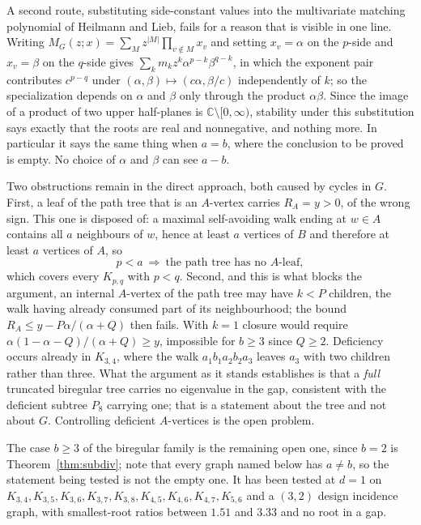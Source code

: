 \documentclass[11pt]{article}
\theoremstyle{remark}
\begin{document}
A second route, substituting side-constant values into the multivariate matching
polynomial of Heilmann and Lieb, fails for a reason that is visible in one line.
Writing $M_G(z;x)=\sum_Mz^{|M|}\prod_{v\notin M}x_v$ and setting $x_v=\alpha$ on
the $p$-side and $x_v=\beta$ on the $q$-side gives
$\sum_km_kz^k\alpha^{p-k}\beta^{q-k}$, in which the exponent pair contributes
$c^{p-q}$ under $(\alpha,\beta)\mapsto(c\alpha,\beta/c)$ independently of $k$; so
the specialization depends on $\alpha$ and $\beta$ only through the product
$\alpha\beta$. Since the image of a product of two upper half-planes is
$\mathbb C\setminus[0,\infty)$, stability under this substitution says exactly
that the roots are real and nonnegative, and nothing more. In particular it says
the same thing when $a=b$, where the conclusion to be proved is empty. No choice
of $\alpha$ and $\beta$ can see $a-b$.

Two obstructions remain in the direct approach, both caused by cycles in $G$. First, a leaf of the path
tree that is an $A$-vertex carries $R_A=y>0$, of the wrong sign. This one is
disposed of: a maximal self-avoiding walk ending at $w\in A$ contains all $a$
neighbours of $w$, hence at least $a$ vertices of $B$ and therefore at least $a$
vertices of $A$, so
\[
p<a\ \Longrightarrow\ \text{the path tree has no }A\text{-leaf},
\]
which covers every $K_{p,q}$ with $p<q$. Second, and this is what blocks the
argument, an internal $A$-vertex of the path tree may have $k<P$ children, the
walk having already consumed part of its neighbourhood; the bound
$R_A\le y-P\alpha/(\alpha+Q)$ then fails. With $k=1$ closure would require
$\alpha(1-\alpha-Q)/(\alpha+Q)\ge y$, impossible for $b\ge3$ since $Q\ge2$.
Deficiency occurs already in $K_{3,4}$, where the walk $a_1b_1a_2b_2a_3$ leaves
$a_3$ with two children rather than three. What the argument as it stands
establishes is that a \emph{full} truncated biregular tree carries no eigenvalue
in the gap, consistent with the deficient subtree $P_8$ carrying one; that is a
statement about the tree and not about $G$. Controlling deficient $A$-vertices
is the open problem.

The case $b\ge3$ of the biregular family is the remaining open one, since $b=2$
is Theorem~\ref{thm:subdiv}; note that every graph named below has $a\ne b$, so
the statement being tested is not the empty one. It has been tested at $d=1$ on
$K_{3,4},K_{3,5},K_{3,6},K_{3,7},K_{3,8},K_{4,5},K_{4,6},K_{4,7},K_{5,6}$ and a
$(3,2)$ design incidence graph, with smallest-root ratios between $1.51$ and
$3.33$ and no root in a gap.
\end{document}
